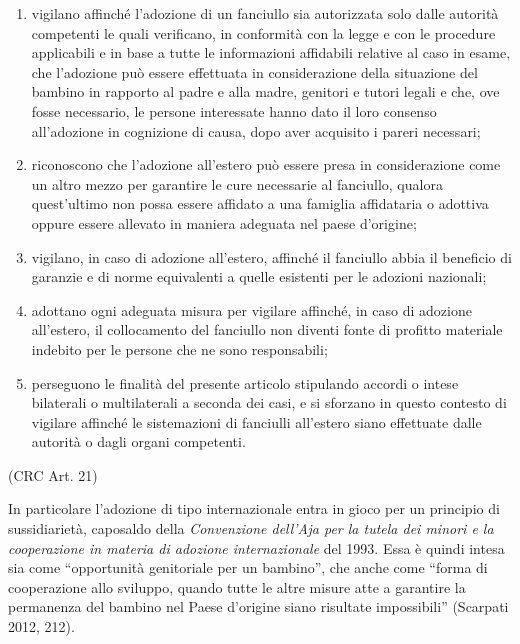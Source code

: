 \documentclass[12pt,oneside,svgnames]{memoir}
\begin{document}
\begin{enumerate}
\def\labelenumi{\alph{enumi})}
\item
  vigilano affinché l'adozione di un fanciullo sia autorizzata solo
  dalle autorità competenti le quali verificano, in conformità con la
  legge e con le procedure applicabili e in base a tutte le informazioni
  affidabili relative al caso in esame, che l'adozione può essere
  effettuata in considerazione della situazione del bambino in rapporto
  al padre e alla madre, genitori e tutori legali e che, ove fosse
  necessario, le persone interessate hanno dato il loro consenso
  all'adozione in cognizione di causa, dopo aver acquisito i pareri
  necessari;
\item
  riconoscono che l'adozione all'estero può essere presa in
  considerazione come un altro mezzo per garantire le cure necessarie al
  fanciullo, qualora quest'ultimo non possa essere affidato a una
  famiglia affidataria o adottiva oppure essere allevato in maniera
  adeguata nel paese d'origine;
\item
  vigilano, in caso di adozione all'estero, affinché il fanciullo abbia
  il beneficio di garanzie e di norme equivalenti a quelle esistenti per
  le adozioni nazionali;
\item
  adottano ogni adeguata misura per vigilare affinché, in caso di
  adozione all'estero, il collocamento del fanciullo non diventi fonte
  di profitto materiale indebito per le persone che ne sono
  responsabili;
\item
  perseguono le finalità del presente articolo stipulando accordi o
  intese bilaterali o multilaterali a seconda dei casi, e si sforzano in
  questo contesto di vigilare affinché le sistemazioni di fanciulli
  all'estero siano effettuate dalle autorità o dagli organi competenti.
\end{enumerate}

(CRC Art. 21)

In particolare l'adozione di tipo internazionale entra in gioco per un
principio di sussidiarietà, caposaldo della \emph{Convenzione dell'Aja
per la tutela dei minori e la cooperazione in materia di adozione
internazionale} del 1993. Essa è quindi intesa sia come ``opportunità
genitoriale per un bambino'', che anche come ``forma di cooperazione
allo sviluppo, quando tutte le altre misure atte a garantire la
permanenza del bambino nel Paese d'origine siano risultate impossibili''
(Scarpati 2012, 212).
\end{document}

